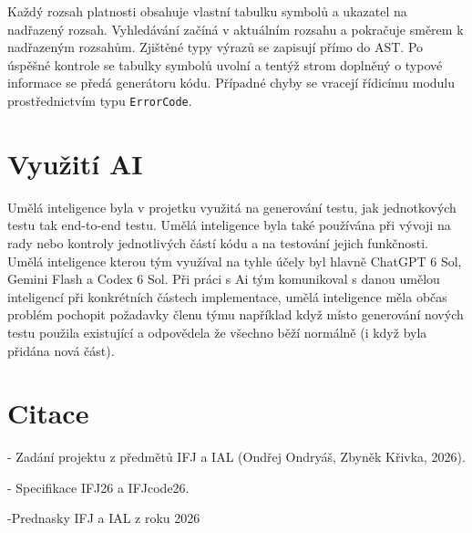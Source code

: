 \documentclass[a4paper, 11pt]{article}
\begin{document}
Každý rozsah platnosti obsahuje vlastní tabulku symbolů
a ukazatel na nadřazený rozsah. Vyhledávání začíná v aktuálním
rozsahu a pokračuje směrem k nadřazeným rozsahům.
Zjištěné typy výrazů se zapisují přímo do AST. Po úspěšné kontrole se tabulky symbolů uvolní a tentýž strom doplněný o typové informace se předá generátoru kódu. Případné chyby se vracejí řídicímu modulu prostřednictvím typu \texttt{ErrorCode}.

\section{Využití AI}

Umělá inteligence byla v projetku využitá na generování testu, jak jednotkových testu tak end-to-end testu. Umělá inteligence byla také používána při vývoji na rady nebo kontroly jednotlivých částí kódu a na testování jejich funkčnosti. Umělá inteligence kterou tým využíval na tyhle účely byl hlavně ChatGPT 6 Sol, Gemini Flash a Codex 6 Sol. Při práci s Ai tým komunikoval s danou umělou inteligencí při konkrétních částech implementace, umělá inteligence měla občas problém pochopit požadavky členu týmu například když místo generování nových testu použila existující a odpovědela že všechno běží normálně (i když byla přidána nová část).

\section{Citace}

- Zadání projektu z předmětů IFJ a IAL (Ondřej Ondryáš, Zbyněk Křivka, 2026).

- Specifikace IFJ26 a IFJcode26.

-Prednasky IFJ a IAL z roku 2026
\end{document}

